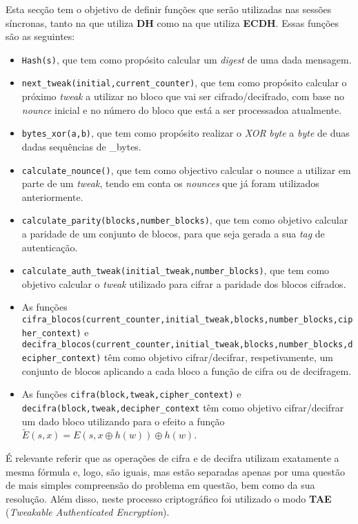\documentclass[11pt]{article}
\begin{document}
    Esta secção tem o objetivo de definir funções que serão utilizadas nas
sessões síncronas, tanto na que utiliza \textbf{DH} como na que utiliza
\textbf{ECDH}. Essas funções são as seguintes:

\begin{itemize}
\item
  \texttt{Hash(s)}, que tem como propósito calcular um \emph{digest} de
  uma dada mensagem.
\item
  \texttt{next\_tweak(initial,current\_counter)}, que tem como propósito
  calcular o próximo \emph{tweak} a utilizar no bloco que vai ser
  cifrado/decifrado, com base no \emph{nounce} inicial e no número do
  bloco que está a ser processadoa atualmente.
\item
  \texttt{bytes\_xor(a,b)}, que tem como propósito realizar o \emph{XOR}
  \emph{byte} a \emph{byte} de duas dadas sequências de \_bytes.
\item
  \texttt{calculate\_nounce()}, que tem como objectivo calcular o nounce
  a utilizar em parte de um \emph{tweak}, tendo em conta os
  \emph{nounces} que já foram utilizados anteriormente.
\item
  \texttt{calculate\_parity(blocks,number\_blocks)}, que tem como
  objetivo calcular a paridade de um conjunto de blocos, para que seja
  gerada a sua \emph{tag} de autenticação.
\item
  \texttt{calculate\_auth\_tweak(initial\_tweak,number\_blocks)}, que
  tem como objetivo calcular o \emph{tweak} utilizado para cifrar a
  paridade dos blocos cifrados.
\item
  As funções
  \texttt{cifra\_blocos(current\_counter,initial\_tweak,blocks,number\_blocks,cipher\_context)}
  e
  \texttt{decifra\_blocos(current\_counter,initial\_tweak,blocks,number\_blocks,decipher\_context)}
  têm como objetivo cifrar/decifrar, respetivamente, um conjunto de
  blocos aplicando a cada bloco a função de cifra ou de decifragem.
\item
  As funções \texttt{cifra(block,tweak,cipher\_context)} e
  \texttt{decifra(block,tweak,decipher\_context} têm como objetivo
  cifrar/decifrar um dado bloco utilizando para o efeito a função
  $\tilde{E}(s,x) = E(s,x \oplus h(w)) \oplus h(w)$.
\end{itemize}

É relevante referir que as operações de cifra e de decifra utilizam
exatamente a mesma fórmula e, logo, são iguais, mas estão separadas
apenas por uma questão de mais simples compreensão do problema em
questão, bem como da sua resolução. Além disso, neste processo
criptográfico foi utilizado o modo \textbf{TAE} (\emph{Tweakable
Authenticated Encryption}).
\end{document}
